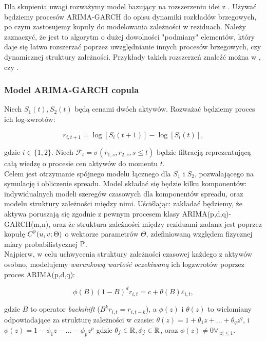 Dla skupienia uwagi rozważymy model bazujący na rozszerzeniu idei z \cite{Herath_Copula_Crack_Spread}. Używać będziemy procesów ARIMA-GARCH do opisu dynamiki rozkładów brzegowych, po czym zastosujemy kopuły do modelowania zależności w reziduach. Należy zaznaczyć, że jest to algorytm o dużej dowolności "podmiany" elementów, który daje się łatwo rozszerzać poprzez uwzględnianie innych procesów brzegowych, czy dynamicznej struktury zależności. Przykłady takich rozszerzeń znaleźć można w \cite{Espen_Crack_Spread_Copula}, \cite{Bernard_Pricing_Multivariate_Options_with_copulae} czy \cite{Cherubini_Dynamic_Copula_Methods_in_Finance}.\\

\subsubsection{Model ARIMA-GARCH copula}
Niech $S_1(t), S_2(t)$ będą cenami dwóch aktywów. Rozważać będziemy proces ich log-zwrotów:

$$ r_{i, t+1} = \log[S_i(t+1)] - \log[S_i(t)],$$

gdzie $i\in\{1,2\}$. Niech $\mathcal{F}_t = \sigma(r_{1,s}, r_{2,s}, s\leqslant t)$ będzie filtracją reprezentującą całą wiedzę o procesie cen aktywów do momentu $t$.\\

Celem jest otrzymanie spójnego modelu łącznego dla $S_1$ i $S_2$, pozwalającego na symulację i obliczenie spreadu. Model składać się będzie kilku komponentów: indywidualnych modeli szeregów czasowych dla komponentów spreadu, oraz modelu struktury zależności między nimi. Uściślając: zakładać będziemy, że aktywa poruszają się zgodnie z pewnym procesem klasy ARIMA(p,d,q)-GARCH(m,n), oraz że struktura zależności między reziduami zadana jest poprzez kopułę $C^{\mathbb{P}}(u, v; \Theta)$ o wektorze parametrów $\Theta$, zdefiniowaną względem fizycznej miary probabilistycznej $\mathbb{P}$.\\

Najpierw, w celu uchwycenia struktury zależności czasowej każdego z aktywów osobno, modelujemy \emph{warunkową wartość oczekiwaną} ich logzwrotów poprzez proces ARIMA(p,d,q):

\begin{equation}
	\phi(B)(1-B)^d r_{i, t} = c + \theta(B)\varepsilon_{i, t},
	\label{eq:arima_part}
\end{equation}

gdzie $B$ to operator \emph{backshift} ($B^kr_{i, t} = r_{i, t-k}$), a $\phi(z)$ i $\theta(z)$ to wielomiany odpowiadające za strukturę zależności w czasie: $\theta(z) = 1 + \theta_1z + \dots + \theta_qz^q$, i $\phi(z) = 1 - \phi_1z - \dots - \phi_pz^p$ gdzie $\theta_j\in\mathbb{R}, \phi_j\in\mathbb{R}$, oraz $\phi(z) \not=0 \forall_{\vert z \vert \leqslant 1}$.

